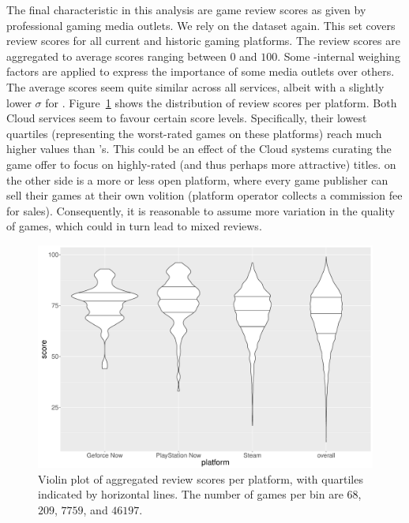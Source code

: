 The final characteristic in this analysis are game review scores as given by professional gaming media outlets. We rely on the \metacritic dataset again. This set covers review scores for all current and historic gaming platforms. The review scores are aggregated to average scores ranging between $0$ and $100$. Some \metacritic-internal weighing factors are applied to express the importance of some media outlets over others.
The average scores seem quite similar across all services, albeit with a slightly lower $\sigma$ for \gfnow. Figure~\ref{fig:scores-by-platform} shows the distribution of review scores per platform. Both Cloud services seem to favour certain score levels. Specifically, their lowest quartiles (representing the worst-rated games on these platforms) reach much higher values than \steam's. This could be an effect of the Cloud systems curating the game offer to focus on highly-rated (and thus perhaps more attractive) titles. \steam on the other side is a more or less open platform, where every game publisher can sell their games at their own volition (platform operator collects a commission fee for sales). Consequently, it is reasonable to assume more variation in the quality of games, which could in turn lead to mixed reviews.




\begin{figure}[!t]
	\centering
	\includegraphics[width=1.0\columnwidth]{images/scores-by-platform-violin.pdf}
	\caption{Violin plot of aggregated review scores per platform, with quartiles indicated by horizontal lines. The number of games per bin are $68$, $209$, $7759$, and $46197$.}
\label{fig:scores-by-platform}
\end{figure}


